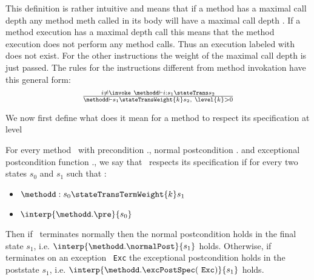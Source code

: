 This definition is rather intuitive and means that if a method \methodd{}
 has a maximal call depth  any method \mbox{\rm meth}  called in its body will have a maximal call depth . 
If a method execution has a maximal depth call  this means that the method execution does not perform any method calls.
Thus an execution labeled with  does not exist.
 For the other instructions the weight of the maximal call depth is just passed. The rules for the instructions different from 
method invokation have this general form: 
$$ \begin{array}{l}
              \frac{ i \neq \invoke \  \methodd \vdash  i: s_1 \stateTrans s_2 }{ \methodd \vdash s_1 \stateTransWeight{k} s_2 , \  \level{k} > 0}
\end{array}$$
 
We now first define what does it mean for a method to respect its specification at level 
\begin{defCorrect} \label{defCorrectLevel}
For every method \methodd \ with precondition \methodd.\pre, normal postcondition \methodd.\normalPost
and exceptional postcondition function \methodd.\excPostSpec, we say that \methodd \ respects its specification if 
for every two states $s_0$ and $s_1$ such that :
\begin{itemize}
      
      \item   $\methodd : s_0  \stateTransTermWeight{k} s_1   $
      \item   $ \interp{\methodd.\pre }{ s_0 }$
\end{itemize}
Then if \methodd \ terminates normally then the normal postcondition holds in the final state $s_1 $, i.e.  $\interp{\methodd.\normalPost}{s_1}$ holds. 
Otherwise, if  \methodd{}  terminates on an exception \mbox{ \rm \texttt{Exc}} the exceptional postcondition holds in the poststate $s_1 $, i.e.
$ \interp{\methodd.\excPostSpec(  \mbox{ \rm \texttt{Exc}} )}{s_1} $ holds.
\end{defCorrect}

